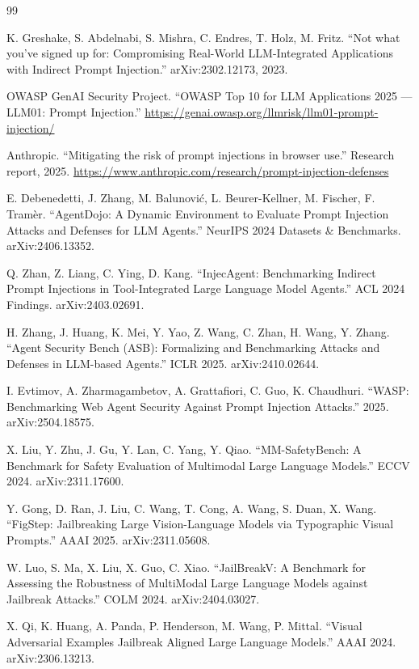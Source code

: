\documentclass[11pt,a4paper]{article}
\begin{document}
\begin{thebibliography}{99}

 K. Greshake, S. Abdelnabi, S. Mishra, C. Endres, T. Holz, M. Fritz. ``Not what you've signed up for: Compromising Real-World LLM-Integrated Applications with Indirect Prompt Injection.'' arXiv:2302.12173, 2023.

 OWASP GenAI Security Project. ``OWASP Top 10 for LLM Applications 2025 --- LLM01: Prompt Injection.'' \url{https://genai.owasp.org/llmrisk/llm01-prompt-injection/}

 Anthropic. ``Mitigating the risk of prompt injections in browser use.'' Research report, 2025. \url{https://www.anthropic.com/research/prompt-injection-defenses}

 E. Debenedetti, J. Zhang, M. Balunović, L. Beurer-Kellner, M. Fischer, F. Tramèr. ``AgentDojo: A Dynamic Environment to Evaluate Prompt Injection Attacks and Defenses for LLM Agents.'' NeurIPS 2024 Datasets \& Benchmarks. arXiv:2406.13352.

 Q. Zhan, Z. Liang, C. Ying, D. Kang. ``InjecAgent: Benchmarking Indirect Prompt Injections in Tool-Integrated Large Language Model Agents.'' ACL 2024 Findings. arXiv:2403.02691.

 H. Zhang, J. Huang, K. Mei, Y. Yao, Z. Wang, C. Zhan, H. Wang, Y. Zhang. ``Agent Security Bench (ASB): Formalizing and Benchmarking Attacks and Defenses in LLM-based Agents.'' ICLR 2025. arXiv:2410.02644.

 I. Evtimov, A. Zharmagambetov, A. Grattafiori, C. Guo, K. Chaudhuri. ``WASP: Benchmarking Web Agent Security Against Prompt Injection Attacks.'' 2025. arXiv:2504.18575.

 X. Liu, Y. Zhu, J. Gu, Y. Lan, C. Yang, Y. Qiao. ``MM-SafetyBench: A Benchmark for Safety Evaluation of Multimodal Large Language Models.'' ECCV 2024. arXiv:2311.17600.

 Y. Gong, D. Ran, J. Liu, C. Wang, T. Cong, A. Wang, S. Duan, X. Wang. ``FigStep: Jailbreaking Large Vision-Language Models via Typographic Visual Prompts.'' AAAI 2025. arXiv:2311.05608.

 W. Luo, S. Ma, X. Liu, X. Guo, C. Xiao. ``JailBreakV: A Benchmark for Assessing the Robustness of MultiModal Large Language Models against Jailbreak Attacks.'' COLM 2024. arXiv:2404.03027.

 X. Qi, K. Huang, A. Panda, P. Henderson, M. Wang, P. Mittal. ``Visual Adversarial Examples Jailbreak Aligned Large Language Models.'' AAAI 2024. arXiv:2306.13213.


\end{thebibliography}
\end{document}
